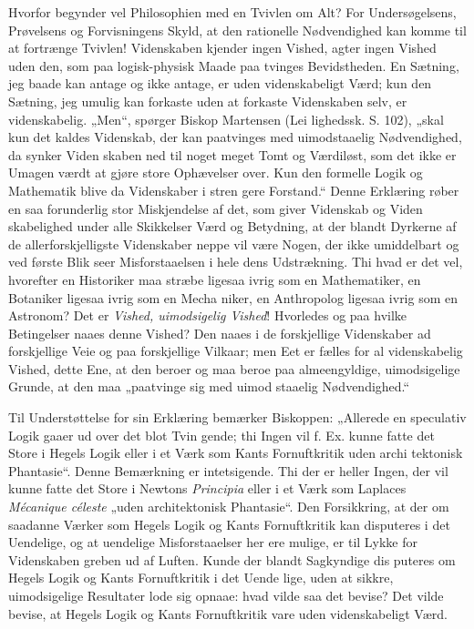 \documentclass[12pt]{book}
\newcommand{\opage}[1]{\marginnote{\footnotesize\textit{[#1]}}}
\begin{document}
Hvorfor begynder vel Philosophien med en Tvivlen om
Alt? For Undersøgelsens, Prøvelsens og Forvisningens
Skyld, at den rationelle Nødvendighed kan komme til at
fortrænge Tvivlen! Videnskaben kjender ingen Vished, agter
ingen Vished uden den, som paa logisk-physisk Maade paa\-%
tvinges Bevidstheden. En Sætning, jeg baade kan antage og
ikke antage, er uden videnskabeligt Værd; kun den Sætning,
jeg umulig kan forkaste uden at forkaste Videnskaben selv,
er videnskabelig. „Men“, spørger Biskop Martensen (Lei\-%
lighedssk. S. 102), „skal kun det kaldes Videnskab, der kan
paatvinges med uimodstaaelig Nødvendighed, da synker Viden\-%
skaben ned til noget meget Tomt og Værdiløst, som det ikke
er Umagen værdt at gjøre store Ophævelser over. Kun den
formelle Logik og Mathematik blive da Videnskaber i stren\-%
gere Forstand.“ Denne Erklæring røber en saa forunderlig
stor Miskjendelse af det, som giver Videnskab og Viden\-%
skabelighed under alle Skikkelser Værd og Betydning, at der
blandt Dyrkerne af de allerforskjelligste Videnskaber neppe
vil være Nogen, der ikke umiddelbart og ved første Blik
seer Misforstaaelsen i hele dens Udstrækning. Thi hvad er
det vel, hvorefter en Historiker maa stræbe ligesaa ivrig som
en Mathematiker, en Botaniker ligesaa ivrig som en Mecha\-%
niker, en Anthropolog ligesaa ivrig som en Astronom? Det
er \emph{Vished, uimodsigelig Vished}! Hvorledes og paa %
hvilke Betingelser naaes denne Vished? Den naaes i de
forskjellige Videnskaber ad forskjellige Veie og paa forskjellige
Vilkaar; men Eet er fælles for al videnskabelig Vished,
dette Ene, at den beroer og maa beroe paa almeengyldige,
\opage{108}\setcounter{footnote}{0}%
uimodsigelige Grunde, at den maa „paatvinge sig med uimod\-%
staaelig Nødvendighed.“

Til Understøttelse for sin Erklæring bemærker Biskoppen:
„Allerede en speculativ Logik gaaer ud over det blot Tvin\-%
gende; thi Ingen vil f. Ex. kunne fatte det Store i Hegels
Logik eller i et Værk som Kants Fornuftkritik uden archi\-%
tektonisk Phantasie“. Denne Bemærkning er intetsigende.
Thi der er heller Ingen, der vil kunne fatte det Store
i Newtons \textit{Principia} eller i et Værk som Laplaces \textit{Mécanique
céleste} „uden architektonisk Phantasie“. Den Forsikkring,
at der om saadanne Værker som Hegels Logik og Kants
Fornuftkritik kan disputeres i det Uendelige, og at uendelige
Misforstaaelser her ere mulige, er til Lykke for Videnskaben
greben ud af Luften. Kunde der blandt Sagkyndige dis\-%
puteres om Hegels Logik og Kants Fornuftkritik i det Uende\-%
lige, uden at sikkre, uimodsigelige Resultater lode sig opnaae:
hvad vilde saa det bevise? Det vilde bevise, at Hegels
Logik og Kants Fornuftkritik vare uden videnskabeligt Værd.
\end{document}
